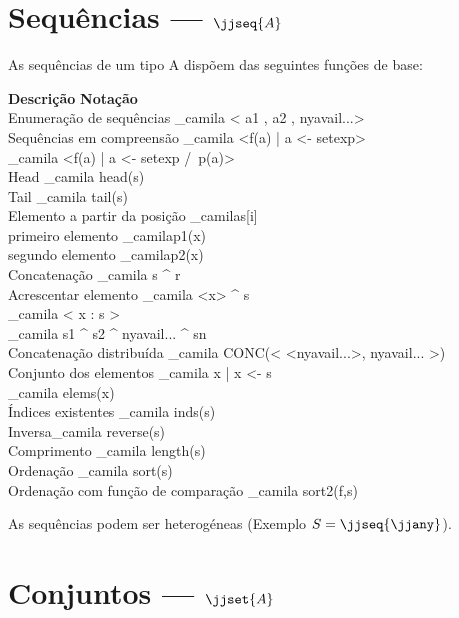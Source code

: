 \documentclass[portuges,a4paper]{article}
\begin{document}
\section{Sequências --- $\jjseq{A}$}

As sequências de um tipo A dispõem das seguintes funções de base:

\begin{framed}
\noindent \textbf{Descrição}  \hfill  \textbf{Notação} \ \  \\
 Enumeração de sequências \dotfill \_camila{ < a1 , a2 , nyavail{...}> } \\
 Sequências em compreensão \dotfill \_camila{ <f(a)  | a <- setexp>} \\
 \mbox{}                   \hfill \_camila{ <f(a)  | a <- setexp /\ p(a)>} \\
 Head \dotfill \_camila{ head(s)}  \\
 Tail \dotfill \_camila{ tail(s)} \\
 Elemento a partir da posição \dotfill \_camila{s[i]} \\
 primeiro elemento \dotfill \_camila{p1(x) } \\
 segundo elemento \dotfill \_camila{p2(x) } \\
 Concatenação \dotfill\_camila{ s ^ r} \\
 Acrescentar elemento \dotfill\_camila{  <x> ^ s} \\
 \mbox{} \hfill          \_camila{ < x : s > } \\
 \mbox{} \hfill          \_camila{ s1 ^ s2 ^ nyavail{...} ^ sn } \\
 Concatenação distribuída \dotfill\_camila{ CONC(< <nyavail{...}>, nyavail{...} >) } \\
 Conjunto dos elementos \dotfill\_camila{  { x | x <- s } } \\
 \mbox{} \hfill          \_camila{  elems(x) } \\
 Índices existentes \dotfill\_camila{ inds(s) } \\
 Inversa\dotfill \_camila{  reverse(s) } \\
 Comprimento \dotfill \_camila{  length(s) } \\
 Ordenação \dotfill\_camila{  sort(s)  } \\
 Ordenação com função de comparação  \dotfill\_camila{  sort2(f,s)}
\end{framed}

As sequências podem ser heterogéneas (Exemplo $S=\jjseq{\jjany}$).

\section{Conjuntos --- $\jjset{A}$}
\end{document}
